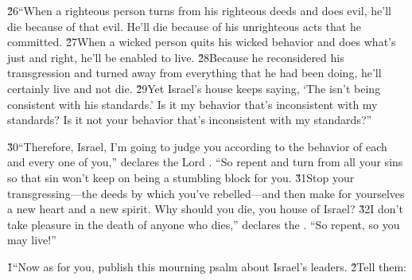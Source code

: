 \v{26}``When a righteous person turns from his righteous deeds and does evil, he'll die because of that evil. He'll die because of his unrighteous acts that he committed. \v{27}When a wicked person quits his wicked behavior and does what's just and right, he'll be enabled to live. \v{28}Because he reconsidered his transgression and turned away from everything that he had been doing, he'll certainly live and not die. \v{29}Yet Israel's house keeps saying, `The  isn't being consistent with his standards.' Is it my behavior that's inconsistent with my standards? Is it not your behavior that's inconsistent with my standards?''

\v{30}``Therefore, Israel, I'm going to judge you according to the behavior of each and every one of you,'' declares the Lord . ``So repent and turn from all your sins so that sin won't keep on being a stumbling block for you. \v{31}Stop your transgressing---the deeds by which you've rebelled---and then make for yourselves a new heart and a new spirit. Why should you die, you house of Israel? \v{32}I don't take pleasure in the death of anyone who dies,'' declares the . ``So repent, so you may live!''

\v{1}``Now as for you, publish this mourning psalm about Israel's leaders. \v{2}Tell them:

